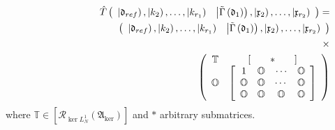 \documentclass[aps,preprint]{revtex4}
\begin{document}
\begin{eqnarray}
&&\hat{T}\left( 
\begin{array}{cc}
\left\vert \mathfrak{d}_{ref}\right) ,\left\vert k_{2}\right) ,\ldots
,\left\vert k_{r_{1}}\right) & \left\vert \tilde{\Gamma}\left( \mathfrak{d}%
_{1}\right) \right) \mathfrak{,}\left\vert \mathfrak{x}_{2}\right) ,\ldots
,\left\vert \mathfrak{x}_{r_{2}}\right)%
\end{array}%
\right) =  \notag \\
&&\qquad \qquad \left( 
\begin{array}{cc}
\left\vert \mathfrak{d}_{ref}\right) ,\left\vert k_{2}\right) ,\ldots
,\left\vert k_{r_{1}}\right) & \left\vert \tilde{\Gamma}\left( \mathfrak{d}%
_{1}\right) \right) \mathfrak{,}\left\vert \mathfrak{x}_{2}\right) ,\ldots
,\left\vert \mathfrak{x}_{r_{2}}\right)%
\end{array}%
\right)  \notag \\
&&\times \\
&&\qquad \qquad \qquad \qquad \qquad \qquad \qquad \qquad \left( 
\begin{array}{cc}
\mathbb{T} & \left[ \qquad \ast \qquad \right] \\ 
\mathbb{O} & \left[ 
\begin{array}{cccc}
1 & \mathbb{O} & \mathbf{\cdots } & \mathbb{O} \\ 
\mathbb{O} & \mathbb{O} & \cdots & \mathbb{O} \\ 
\mathbb{O} & \mathbb{O} & \mathbb{O} & \mathbb{O}%
\end{array}%
\right]%
\end{array}%
\right)
\end{eqnarray}%
where $\mathbb{T\in }\left[ \mathcal{R}_{\ker L_{N}^{1}}\left( \mathfrak{A}%
_{\ker }\right) \right] $ and $\ast $ arbitrary submatrices.
\end{document}
